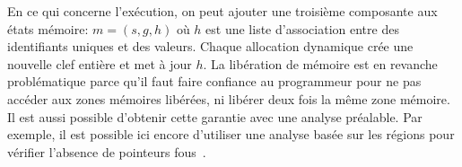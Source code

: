 En ce qui concerne l'exécution, on peut ajouter une troisième composante aux
états mémoire: $m = (s, g, h)$ où $h$ est une liste d'association entre des
identifiants uniques et des valeurs. Chaque allocation dynamique crée une
nouvelle clef entière et met à jour $h$. La libération de mémoire est en
revanche problématique parce qu'il faut faire confiance au programmeur pour ne
pas accéder aux zones mémoires libérées, ni libérer deux fois la même zone
mémoire.  Il est aussi possible d'obtenir cette garantie avec
une analyse préalable. Par exemple, il est possible ici encore d'utiliser une
analyse basée sur les régions pour vérifier l'absence de pointeurs
fous~\cite{ifm10}.




